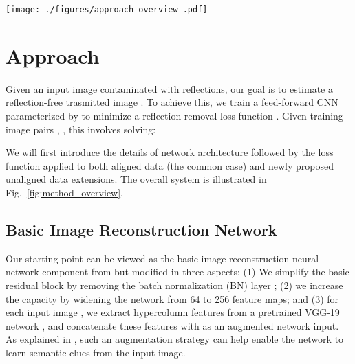 \documentclass[10pt,twocolumn,letterpaper]{article}
\begin{document}
\begin{figure*}
\vspace{-5pt}
	\centering
     \texttt{[image: ./figures/approach\_overview\_.pdf]}
     \vspace{-2pt}
	\caption{Overview of our approach for single image reflection removal.}\label{fig:method_overview}
\vspace{-1pt}
\end{figure*}

\section{Approach} \label{sec:approach}
Given an input image  contaminated with reflections, our goal is to estimate a reflection-free trasmitted image .
To achieve this, we train a feed-forward CNN  parameterized by  to minimize a reflection removal loss function . Given training image pairs , , this involves solving:

We will first introduce the details of network architecture  followed by the loss function  applied to both aligned data (the common case) and newly proposed unaligned data extensions.  The overall system is illustrated in Fig.~\ref{fig:method_overview}.

\subsection{Basic Image Reconstruction Network} \label{sec:eicnn}

Our starting point can be viewed as the basic image reconstruction neural network component from \cite{fan2017generic} but modified in three aspects: (1) We simplify the basic residual block \cite{He_2016_CVPR} by removing the batch normalization (BN) layer \cite{ioffe2015batch}; (2) we increase the  capacity by widening the network from 64 to 256 feature maps; and (3)  for each input image ,  we extract hypercolumn features \cite{Hariharan_2015_CVPR}  from a pretrained VGG-19 network \cite{DBLP:journals/corr/SimonyanZ14a}, and concatenate these features with  as an augmented network input.  As explained in \cite{zhang2018single}, such an augmentation strategy can help enable the network to learn semantic clues from the input image.
\end{document}

